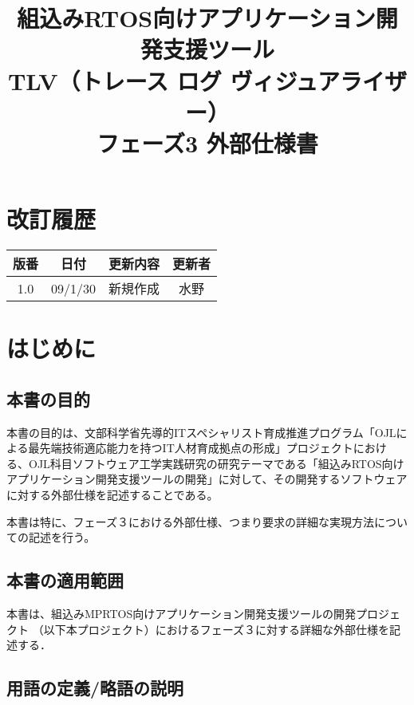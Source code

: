 \documentclass[a4j]{jsarticle}
\title{組込みRTOS向けアプリケーション開発支援ツール\\
TLV（トレース ログ ヴィジュアライザー）\\
フェーズ3 外部仕様書}
\begin{document}
\maketitle
\titlepage

\section*{改訂履歴}
\begin{table}[h]
 \centering
 \begin{tabular}{|c|c|c|c|} \hline
  版番& 日付&    更新内容& 更新者\\ \hline\hline
  1.0 & 09/1/30 & 新規作成& 水野\\ \hline
 \end{tabular}
\end{table}
\clearpage

\tableofcontents
\clearpage

\section{はじめに}
\subsection{本書の目的}
本書の目的は、文部科学省先導的ITスペシャリスト育成推進プログラム「OJLによる最先端技術適応能力を持つIT人材育成拠点の形成」プロジェクトにおける、OJL科目ソフトウェア工学実践研究の研究テーマである「組込みRTOS向けアプリケーション開発支援ツールの開発」に対して、その開発するソフトウェアに対する外部仕様を記述することである。

本書は特に、フェーズ３における外部仕様、つまり要求の詳細な実現方法についての記述を行う。

\subsection{本書の適用範囲}
本書は、組込みMPRTOS向けアプリケーション開発支援ツールの開発プロジェクト
（以下本プロジェクト）におけるフェーズ３に対する詳細な外部仕様を記述する．

\subsection{用語の定義/略語の説明}
\end{document}
